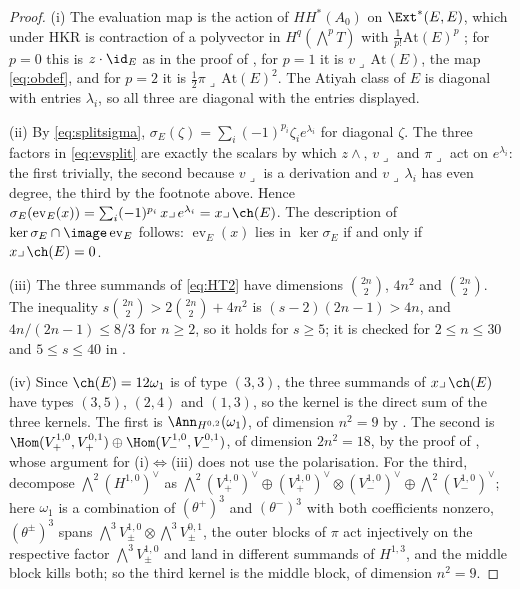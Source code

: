 \begin{proof}
(i) The evaluation map is the action of $HH^{*}(A_{0})$ on
$\Ext^{*}(E,E)$, which under HKR is contraction of a polyvector in
$H^{q}(\bigwedge^{p}T)$ with $\tfrac{1}{p!}\mathrm{At}(E)^{p}$
\cite{BF08}; for $p=0$ this is $z\cdot\id_{E}$ as in the proof of
, for $p=1$ it is $v\lrcorner\,\mathrm{At}(E)$, the map
\eqref{eq:obdef}, and for $p=2$ it is $\tfrac12\pi\lrcorner\,\mathrm{At}(E)^{2}$.
The Atiyah class of $E$ is diagonal with entries $\lambda_{i}$, so all three
are diagonal with the entries displayed.

(ii) By \eqref{eq:splitsigma}, $\sigma_{E}(\zeta)=\sum_{i}(-1)^{p_{i}}\zeta_{i}
e^{\lambda_{i}}$ for diagonal $\zeta$. The three factors in \eqref{eq:evsplit}
are exactly the scalars by which $z\wedge$, $v\lrcorner$ and $\pi\lrcorner$
act on $e^{\lambda_{i}}$: the first trivially, the second because
$v\lrcorner$ is a derivation and $v\lrcorner\,\lambda_{i}$ has even degree,
the third by the footnote above. Hence
$\sigma_{E}(\operatorname{ev}_{E}(x))=\sum_{i}(-1)^{p_{i}}\,x\lrcorner\,
e^{\lambda_{i}}=x\lrcorner\,\ch(E)$. The description of
$\ker\sigma_{E}\cap\image\operatorname{ev}_{E}$ follows: $\operatorname{ev}_{E}(x)$
lies in $\ker\sigma_{E}$ if and only if $x\lrcorner\,\ch(E)=0$.

(iii) The three summands of \eqref{eq:HT2} have dimensions $\binom{2n}{2}$,
$4n^{2}$ and $\binom{2n}{2}$. The inequality
$s\binom{2n}{2}>2\binom{2n}{2}+4n^{2}$ is $(s-2)(2n-1)>4n$, and
$4n/(2n-1)\le8/3$ for $n\ge2$, so it holds for $s\ge5$; it is checked for
$2\le n\le30$ and $5\le s\le40$ in .

(iv) Since $\ch(E)=12\omega_{1}$ is of type $(3,3)$, the three summands of
$x\lrcorner\,\ch(E)$ have types $(3,5)$, $(2,4)$ and $(1,3)$, so the kernel
is the direct sum of the three kernels. The first is $\Ann_{H^{0,2}}(\omega_{1})$,
of dimension $n^{2}=9$ by . The second is
$\Hom(V_{+}^{1,0},V_{+}^{0,1})\oplus\Hom(V_{-}^{1,0},V_{-}^{0,1})$, of
dimension $2n^{2}=18$, by the proof of , whose
argument for (i)$\Leftrightarrow$(iii) does not use the polarisation. For the
third, decompose $\bigwedge^{2}(H^{1,0})^{\vee}$ as
$\bigwedge^{2}(V_{+}^{1,0})^{\vee}\oplus(V_{+}^{1,0})^{\vee}\otimes(V_{-}^{1,0})^{\vee}
\oplus\bigwedge^{2}(V_{-}^{1,0})^{\vee}$; here $\omega_{1}$ is a combination
of $(\theta^{+})^{3}$ and $(\theta^{-})^{3}$ with both coefficients nonzero,
$(\theta^{\pm})^{3}$ spans $\bigwedge^{3}V_{\pm}^{1,0}\otimes\bigwedge^{3}V_{\pm}^{0,1}$,
the outer blocks of $\pi$ act injectively on the respective factor
$\bigwedge^{3}V_{\pm}^{1,0}$ and land in different summands of $H^{1,3}$,
and the middle block kills both; so the third kernel is the middle block,
of dimension $n^{2}=9$.


\end{proof}
